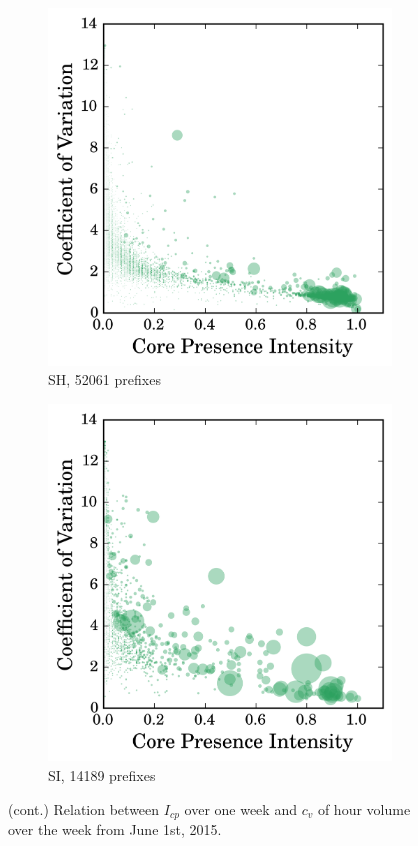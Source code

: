 \begin{figure}
\begin{subfigure}[b]{0.49\textwidth}
                \includegraphics[width=\textwidth]{gfx/chap2/corre_cv_cp_sh.png}
                \caption{SH, 52061 prefixes}
                \label{fig:cv_cp_sh}
        \end{subfigure}
        \begin{subfigure}[b]{0.49\textwidth}
                \includegraphics[width=\textwidth]{gfx/chap2/corre_cv_cp_si.png}
                \caption{SI, 14189 prefixes}
                \label{fig:cv_cp_si}
        \end{subfigure}
\caption{(cont.) Relation between $I_{cp}$ over one week and $c_v$ of hour volume over the week from June 1st, 2015.}
\label{fig:cv_cp_cont}
\end{figure}

